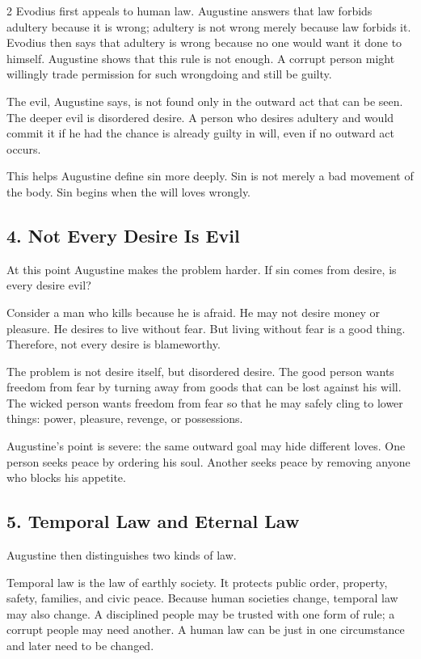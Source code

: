 \documentclass[12pt]{article}
\begin{document}
\begin{multicols}{2}
Evodius first appeals to human law. Augustine answers that law forbids adultery because it is wrong; adultery is not wrong merely because law forbids it. Evodius then says that adultery is wrong because no one would want it done to himself. Augustine shows that this rule is not enough. A corrupt person might willingly trade permission for such wrongdoing and still be guilty.

The evil, Augustine says, is not found only in the outward act that can be seen. The deeper evil is disordered desire. A person who desires adultery and would commit it if he had the chance is already guilty in will, even if no outward act occurs.

This helps Augustine define sin more deeply. Sin is not merely a bad movement of the body. Sin begins when the will loves wrongly.

\subsection*{4. Not Every Desire Is Evil}
At this point Augustine makes the problem harder. If sin comes from desire, is every desire evil?

Consider a man who kills because he is afraid. He may not desire money or pleasure. He desires to live without fear. But living without fear is a good thing. Therefore, not every desire is blameworthy.

The problem is not desire itself, but disordered desire. The good person wants freedom from fear by turning away from goods that can be lost against his will. The wicked person wants freedom from fear so that he may safely cling to lower things: power, pleasure, revenge, or possessions.

Augustine's point is severe: the same outward goal may hide different loves. One person seeks peace by ordering his soul. Another seeks peace by removing anyone who blocks his appetite.

\subsection*{5. Temporal Law and Eternal Law}
Augustine then distinguishes two kinds of law.

Temporal law is the law of earthly society. It protects public order, property, safety, families, and civic peace. Because human societies change, temporal law may also change. A disciplined people may be trusted with one form of rule; a corrupt people may need another. A human law can be just in one circumstance and later need to be changed.


\end{multicols}
\end{document}

